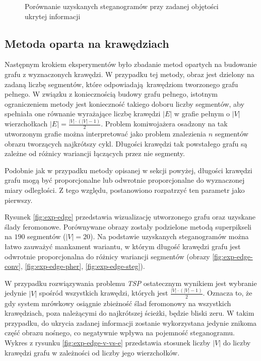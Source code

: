 {{{\begin{figure}
                \caption[Porównanie rezultatów]
                {Porównanie uzyskanych steganogramów przy zadanej objętości ukrytej informacji}
                \label{fig:exp-vertex-results}
            \end{figure}
        }

        \subsection{Metoda oparta na krawędziach}
        {
            Następnym krokiem eksperymentów było zbadanie metod opartych na budowanie grafu z wyznaczonych krawędzi. W
            przypadku tej metody, obraz jest dzielony na zadaną liczbę segmentów, które odpowiadają krawędziom
            tworzonego grafu pełnego. W związku z koniecznością budowy grafu pełnego, istotnym ograniczeniem metody jest
            konieczność takiego doboru liczby segmentów, aby spełniała one równanie wyrażające liczbę krawędzi $|E|$ w
            grafie pełnym o $|V|$ wierzchołkach $|E| = \frac{|V| \cdot (|V| - 1)}{2}$. Problem komiwojażera osadzony na
            tak utworzonym grafie można interpretować jako problem znalezienia $n$ segmentów obrazu tworzących
            najkrótszy cykl. Długości krawędzi tak powstałego grafu są zależne od różnicy wariancji łączących przez nie
            segmenty.

            Podobnie jak w przypadku metody opisanej w sekcji powyżej, długości krawędzi grafu mogą być proporcjonalne
            lub odwrotnie proporcjonalne do wyznaczonej miary odległości. Z tego względu, postanowiono rozpatrzyć ten
            parametr jako pierwszy.

            Rysunek \ref{fig:exp-edge} przedstawia wizualizację utworzonego grafu oraz uzyskane ślady feromonowe.
            Porównywane obrazy zostały podzielone metodą superpikseli na $190$ segmentów ($|V| = 20$). Na podstawie
            uzyskanych steganogramów można łatwo zauważyć mankament wariantu, w którym długość krawędzi grafu jest
            odwrotnie proporcjonalna do różnicy wariancji segmentów (obrazy \ref{fig:exp-edge-conv},
            \ref{fig:exp-edge-pher}, \ref{fig:exp-edge-steg}).

            W przypadku rozwiązywania problemu \textit{TSP} ostatecznym wynikiem jest wybranie jedynie $|V|$ spośród
            wszystkich krawędzi, których jest $\frac{|V| \cdot (|V| - 1)}{2}$. Oznacza to, że gdy system mrówkowy
            osiągnie zbieżność ślad feromonowy na wszystkich krawędziach, poza należącymi do najkrótszej ścieżki, będzie
            bliski zeru. W takim przypadku, do ukrycia zadanej informacji zostanie wykorzystana jedynie znikoma część
            obrazu nośnego, co negatywnie wpływa na pojemność steganogramu. Wykres z rysunku \ref{fig:exp-edge-v-vs-e}
            przedstawia stosunek liczby $|V|$ do liczby krawędzi grafu w zależności od liczby jego wierzchołków.

}}}
